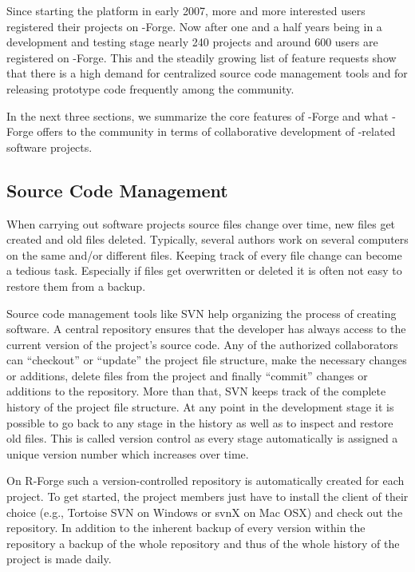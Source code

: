 Since starting the platform in early 2007, more
and more interested users registered their projects on \R{}-Forge. Now
after one and a half years being in a development and testing stage nearly
240 projects and around 600  
users are registered on \R{}-Forge. This and the steadily growing list of
feature requests show that there is a high demand for centralized source code
management tools and for releasing prototype code frequently among the
\R{} community.

In the next three sections, we summarize the core features of
\R{}-Forge and what \R{}-Forge offers to the \R{} community in terms
of  collaborative development of \R{}-related software projects.

\subsection{Source Code Management}

When carrying out software projects source files change over time,
new files get created and old files deleted. Typically, several authors
work on several computers on the same and/or different files. Keeping
track of every file change can become a tedious task. Especially if
files get overwritten or deleted it is often not easy to restore them
from a backup. 

Source code management tools like SVN help organizing the process of
creating software. A central repository ensures that the developer
has always access to the current version of the project's source
code. Any of the authorized collaborators can ``checkout'' or
``update'' the project
file structure, make the necessary changes or additions, delete
files from the project and finally ``commit'' changes or additions
to the repository. More than
that, SVN keeps track of the complete history of the project file
structure. At any point in the development stage it is possible to go
back to any stage in the history as well as to inspect and restore old
files. This is called version control as every stage automatically is
assigned a unique version number which increases over time. 

On R-Forge such a version-controlled repository is automatically
created for each project. To get started, the project members just
have to install the client of their choice (e.g., Tortoise SVN on
Windows or svnX on 
Mac OSX) and check out the repository. In addition to the inherent
backup of every version within the repository a backup of the whole
repository and thus of the whole history of the project is made daily. 

